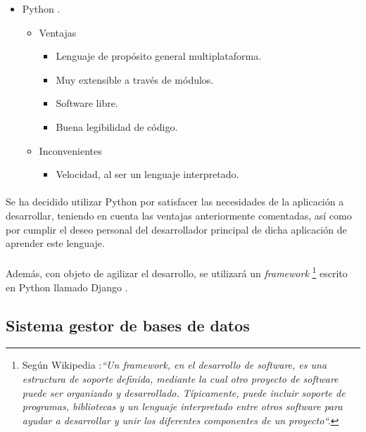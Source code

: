 \begin{itemize}
\begin{itemize}
\begin{itemize}
            \end{itemize}
      \end{itemize}
    \item Python \cite{python}.
      \begin{itemize}
         \item Ventajas
            \begin{itemize}
             \item Lenguaje de propósito general multiplataforma.
             \item Muy extensible a través de módulos.
             \item Software libre.
             \item Buena legibilidad de código.
            \end{itemize}
         \item Inconvenientes
            \begin{itemize}
             \item Velocidad, al ser un lenguaje interpretado.
            \end{itemize}
      \end{itemize}
   \end{itemize}

   \paragraph{}Se ha decidido utilizar Python por satisfacer las necesidades
   de la aplicación a desarrollar, teniendo en cuenta las ventajas anteriormente
   comentadas, así como por cumplir el deseo personal del desarrollador
   principal de dicha aplicación de aprender este lenguaje.

   \paragraph{}Además, con objeto de agilizar el desarrollo, se utilizará
   un \textit{framework} \footnote{Según Wikipedia \cite{wikipedia}:\textit{``Un
   framework, en el desarrollo de software, es una estructura de soporte
   definida, mediante la cual otro proyecto de software puede ser organizado y
   desarrollado. Típicamente, puede incluir soporte de programas, bibliotecas y
   un lenguaje interpretado entre otros software para ayudar a desarrollar y
   unir los diferentes componentes de un proyecto``.}} escrito en Python llamado
   Django \cite{django}.

\subsection{Sistema gestor de bases de datos}
